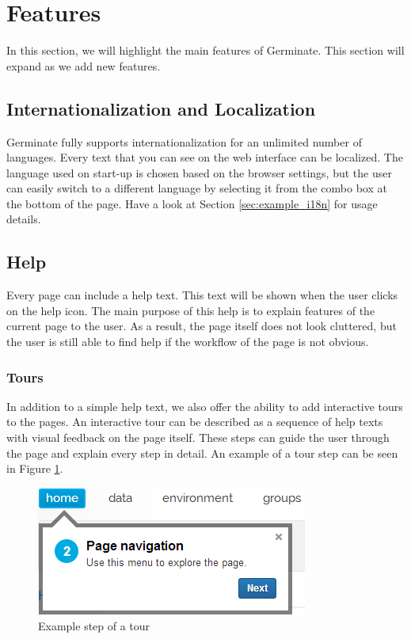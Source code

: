 \section{Features}
In this section, we will highlight the main features of Germinate. This section will expand as we add new features.

\subsection{Internationalization and Localization}
\label{sec:features_i18n}
Germinate fully supports internationalization for an unlimited number of languages. Every text that you can see on the web interface can be localized. The language used on start-up is chosen based on the browser settings, but the user can easily switch to a different language by selecting it from the combo box at the bottom of the page. Have a look at Section \ref{sec:example_i18n} for usage details.

\subsection{Help}
Every page can include a help text. This text will be shown when the user clicks on the help icon. The main purpose of this help is to explain features of the current page to the user. As a result, the page itself does not look cluttered, but the user is still able to find help if the workflow of the page is not obvious.

\subsubsection{Tours}
In addition to a simple help text, we also offer the ability to add interactive tours to the pages. An interactive tour can be described as a sequence of help texts with visual feedback on the page itself. These steps can guide the user through the page and explain every step in detail. An example of a tour step can be seen in Figure \ref{fig:tour}.

\begin{figure}
    \centering
    \includegraphics[scale=0.7]{img/features/tour-example2.png}
    \caption{Example step of a tour}
    \label{fig:tour}
\end{figure}

